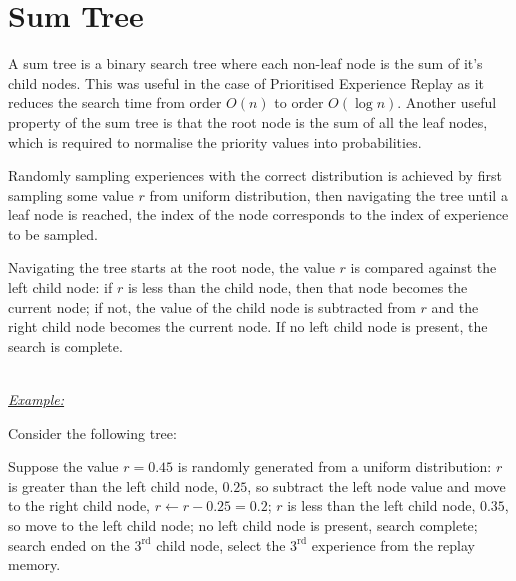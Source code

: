 \chapter{Sum Tree}\label{app:SumTree}

A sum tree is a binary search tree where each non-leaf node is the sum of it's
child nodes.
This was useful in the case of Prioritised Experience Replay as it reduces the
search time from order $O(n)$ to order $O(\log n)$.
Another useful property of the sum tree is that the root node is the sum of all
the leaf nodes, which is required to normalise the priority values into
probabilities.

Randomly sampling experiences with the correct distribution is achieved by first
sampling some value $r$ from uniform distribution, then navigating the tree
until a leaf node is reached, the index of the node corresponds to the index of
experience to be sampled.

Navigating the tree starts at the root node, the value $r$ is compared against
the left child node: if $r$ is less than the child node, then that node becomes
the current node; if not, the value of the child node is subtracted from $r$ and
the right child node becomes the current node.
If no left child node is present, the search is complete.

~\\
\underline{\textit{Example:}}

\noindent Consider the following tree:
\begin{center}
\end{center}
Suppose the value $r = 0.45$ is randomly generated from a uniform distribution:
$r$ is greater than the left child node, $0.25$, so subtract the left node value
and move to the right child node, $r \leftarrow r - 0.25 = 0.2$;
$r$ is less than the left child node, $0.35$, so move to the left child node;
no left child node is present, search complete;
search ended on the $3^\text{rd}$ child node, select the $3^\text{rd}$
experience from the replay memory.
